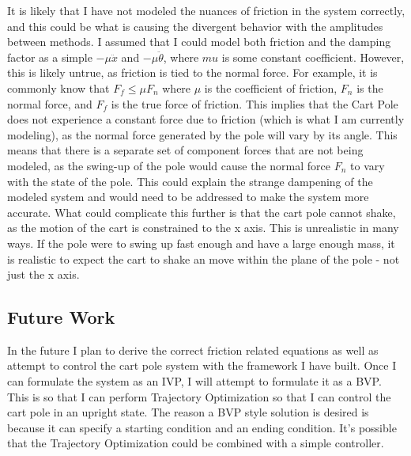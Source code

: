 \documentclass[12pt]{article}
\begin{document}
It is likely that I have not modeled the nuances of friction in the system correctly, and this could
be what is causing the divergent behavior with the amplitudes between methods. I assumed that I could model
both friction and the damping factor as a simple $- \mu \ddot{x}$ and $- \mu \ddot{\theta}$, where $mu$
is some constant coefficient. However, this is likely untrue, as friction is tied to the normal force. For
example, it is commonly know that $F_f \leq \mu F_n$ where $\mu$ is the coefficient of friction, $F_n$ is the
normal force, and $F_f$ is the true force of friction. This implies that the Cart Pole does not experience a
constant force due to friction (which is what I am currently modeling), as the normal force generated by
the pole will vary by its angle. This means
that there is a separate set of component forces that are not being modeled, as the swing-up of
the pole would cause the normal force $F_n$ to vary with the state of the pole. This could explain the strange
dampening of the modeled system and would need to be addressed to make the system more accurate. What could
complicate this further is that the cart pole cannot shake, as the motion of the cart is constrained
to the x axis. This is unrealistic in many ways. If the pole were to swing up fast enough and have a large
enough mass, it is realistic to expect the cart to shake an move within the plane of the pole - not
just the x axis.

\subsection{Future Work}

In the future I plan to derive the correct friction related equations as well as
attempt to control the cart pole system with the framework I have built. Once I can
formulate the system as an IVP, I will attempt to formulate it as a BVP. This is so
that I can perform Trajectory Optimization so that I can control the cart pole in
an upright state. The reason a BVP style solution is desired is because it can specify
a starting condition and an ending condition. It's possible that the Trajectory
Optimization could be combined with a simple controller.

\newpage



\end{document}
